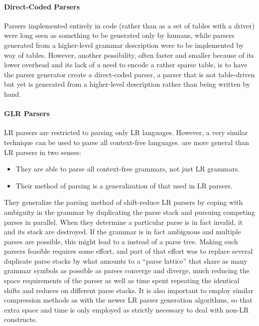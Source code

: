 \paragraph{Direct-Coded Parsers}
Parsers implemented entirely in code (rather than as a set of tables with a driver) were long seen as something to be generated only by humans, while parsers generated from a higher-level grammar description were to be implemented by way of tables. However, another possibility, often faster and smaller because of its lower overhead and its lack of a need to encode a rather sparse table, is to have the parser generator create a direct-coded parser, a parser that is not table-driven but yet is generated from a higher-level description rather than being written by hand.

\paragraph{GLR Parsers} LR parsers are restricted to parsing only LR languages. However, a very similar technique can be used to parse all context-free languages.  are more general than LR parsers in two senses: 
\begin{itemize}
\item They are able to parse all context-free grammars, not just LR grammars.
\item Their method of parsing is a generalization of that used in LR parsers.
\end{itemize}
They generalize the parsing method of shift-reduce LR parsers by coping with ambiguity in the grammar by duplicating the parse stack and pursuing competing parses in parallel. When they determine a particular parse is in fact invalid, it and its stack are destroyed. If the grammar is in fact ambiguous and multiple parses are possible, this might lead to a  instead of a parse tree. Making such parsers feasible requires some effort, and part of that effort was to replace several duplicate parse stacks by what amounts to a ``parse lattice'' that share as many grammar symbols as possible as parses converge and diverge, much reducing the space requirements of the parser as well as time spent repeating the identical shifts and reduces on different parse stacks. It is also important to employ similar compression methods as with the newer LR parser generation algorithms, so that extra space and time is only employed as strictly necessary to deal with non-LR constructs.%

